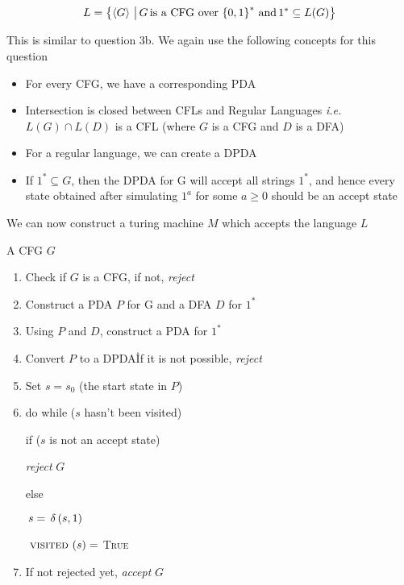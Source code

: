 \documentclass{article}
\begin{document}
\begin{question}

	\begin{align*}
		L = \left\{ \left\langle G \right\rangle \,\big|\, G \,\text{is a CFG over}\, \left\{ 0, 1 \right\}^* \,\text{and}\, 1^* \subseteq L(G)  \right\}
	\end{align*}

	This is similar to question 3b. We again use the following concepts for this question
	\begin{itemize}
		\item For every CFG, we have a corresponding PDA
		\item Intersection is closed between CFLs and Regular Languages \textit{i.e.} $L(G) \cap L(D)$ is a CFL (where $G$ is a CFG and $D$ is a DFA)
		\item For a regular language, we can create a DPDA
		\item If $1^\ast \subseteq G$, then the DPDA for G will accept all strings $1^\ast$, and hence every state obtained after simulating $1^a$ for some $a \ge 0$ should be an accept state
	\end{itemize}

	We can now construct a turing machine $M$ which accepts the language $L$ \br%

	 \br%
	\begin{margin}
		 A CFG $G$

		\begin{enumerate}
			\item Check if $G$ is a CFG, if not, \textit{reject}
			\item Construct a PDA $P$ for G and a DFA $D$ for $1^\ast$
			\item Using $P$ and $D$, construct a PDA for $1^\ast$
			\item Convert $P$ to a DPDA\. If it is not possible, \textit{reject}
			\item Set $s = s_0$ (the start state in $P$)
			\item do while ($s$ hasn't been visited)
				\begin{margin}
					if ($s$ is not an accept state) 
					\begin{margin}
						\textit{reject} $G$
					\end{margin}

					else
					\begin{margin}
						$\,s = \func{\delta}{s, 1}$

						$\func{\mt{\textsc{visited}}}{s} =$ \textsc{True}
					\end{margin}
				\end{margin}
			\item If not rejected yet, \textit{accept} $G$
		\end{enumerate}
	\end{margin} \br%


\end{question}
\end{document}
